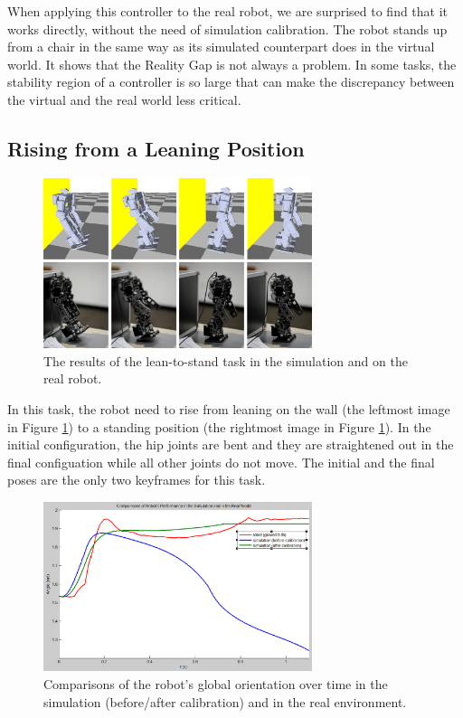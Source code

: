 When applying this controller to the real robot, we are surprised to find that it works directly, without the need of simulation calibration. The robot stands up from a chair in the same way as its simulated counterpart does in the virtual world. It shows that the Reality Gap is not always a problem. In some tasks, the stability region of a controller is so large that can make the discrepancy between the virtual and the real world less critical.

\subsection{Rising from a Leaning Position}

\begin{figure}[!t]
  \centering
  \includegraphics[width=0.7\textwidth]{figures/lean2Stand}
  \caption{The results of the lean-to-stand task in the simulation and on the real robot.}
  \label{fig:lean2Stand}
\end{figure}

In this task, the robot need to rise from leaning on the wall (the leftmost image in Figure \ref{fig:lean2Stand}) to a standing position (the rightmost image in Figure \ref{fig:lean2Stand}). In the initial configuration, the hip joints are bent and they are straightened out in the final configuation while all other joints do not move. The initial and the final poses are the only two keyframes for this task.

\begin{figure}[!t]
  \centering
  \includegraphics[width=0.7\textwidth]{figures/simRobotCompare}
  \caption{Comparisons of the robot's global orientation over time in the simulation (before/after calibration) and in the real environment.}
  \label{fig:simRobotCompare}
\end{figure}



